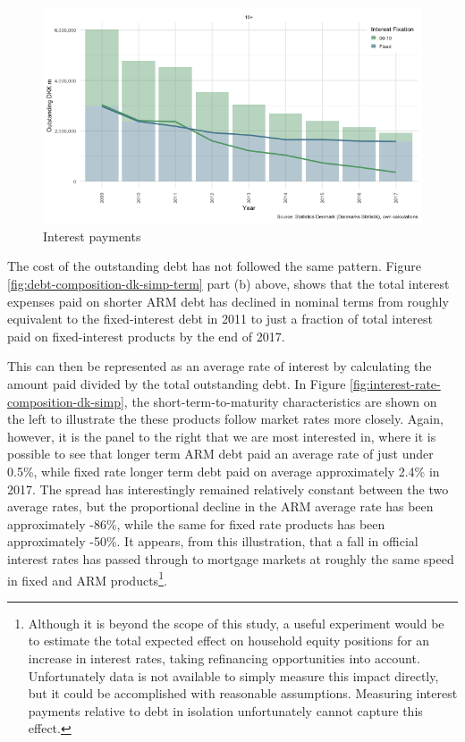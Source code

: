 \documentclass[
]{book}
\begin{document}
\begin{figure}[H]
\includegraphics[width=0.95\linewidth]{figures/debt-composition-dk-simp-term-1-1} \caption{Interest payments}\label{fig:debt-composition-dk-simp-term-1}
\end{figure}

The cost of the outstanding debt has not followed the same pattern. Figure \ref{fig:debt-composition-dk-simp-term} part (b) above, shows that the total interest expenses paid on shorter ARM debt has declined in nominal terms from roughly equivalent to the fixed-interest debt in 2011 to just a fraction of total interest paid on fixed-interest products by the end of 2017.

This can then be represented as an average rate of interest by calculating the amount paid divided by the total outstanding debt. In Figure \ref{fig:interest-rate-composition-dk-simp}, the short-term-to-maturity characteristics are shown on the left to illustrate the these products follow market rates more closely. Again, however, it is the panel to the right that we are most interested in, where it is possible to see that longer term ARM debt paid an average rate of just under 0.5\%, while fixed rate longer term debt paid on average approximately 2.4\% in 2017. The spread has interestingly remained relatively constant between the two average rates, but the proportional decline in the ARM average rate has been approximately -86\%, while the same for fixed rate products has been approximately -50\%. It appears, from this illustration, that a fall in official interest rates has passed through to mortgage markets at roughly the same speed in fixed and ARM products\footnote{Although it is beyond the scope of this study, a useful experiment would be to estimate the total expected effect on household equity positions for an increase in interest rates, taking refinancing opportunities into account. Unfortunately data is not available to simply measure this impact directly, but it could be accomplished with reasonable assumptions. Measuring interest payments relative to debt in isolation unfortunately cannot capture this effect.}.
\end{document}
